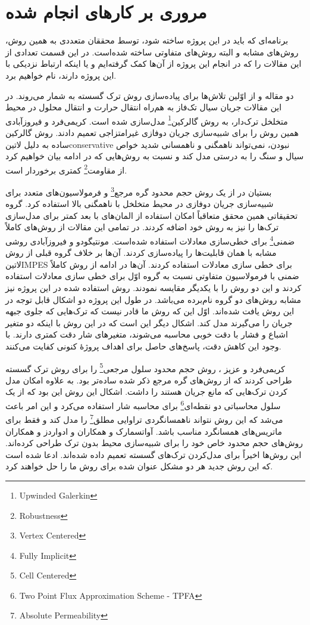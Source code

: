 \section{مروری بر کارهای انجام شده}
برنامه‌ای که باید در این پروژه ساخته شود، توسط محققان متعددی به همین روش، روش‌های مشابه و البته روش‌های متفاوتی ساخته شده‌است. در این قسمت تعدادی از این مقالات را که در انجام این پروژه از آن‌ها کمک گرفته‌ایم و یا اینکه ارتباط نزدیکی با این پروژه دارند، نام خواهیم برد.

دو مقاله \cite{baca} و \cite{noorishad} از اوّلین تلاش‌ها برای پیاده‌سازی روش ترک گسسته به شمار می‌روند. در این مقالات جریان سیال تک‌فاز به هم‌راه انتقال حرارت و انتقال محلول در محیط متخلخل ترک‌دار، به روش گالرکین\footnote{Upwinded Galerkin} مدل‌سازی شده است. کریمی‌فرد و فیروز‌آبادی\cite{karimi1} همین روش را برای شبیه‌سازی جریان دوفازی غیرامتزاجی تعمیم دادند. روش گالرکین ساده به دلیل \text‌لاتین{conservative} نبودن، نمی‌تواند ناهمگنی و ناهمسانی شدید خواص سیال و سنگ را به درستی مدل کند و نسبت به روش‌هایی که در ادامه بیان خواهیم کرد از مقاومت\footnote{Robustness} کمتری برخوردار است.

بستیان در \cite{bastn,basthabil} از یک روش حجم محدود گره مرجع\footnote{Vertex Centered} و فرمولاسیون‌های متعدد  برای شبیه‌سازی  جریان دوفازی در محیط متخلخل با ناهمگنی بالا استفاده کرد. گروه تحقیقاتی همین محقق متعاقباً امکان استفاده از المان‌های با بعد کمتر برای مدل‌سازی ترک‌ها را نیز به روش خود اضافه کردند\cite{reichpaper,reichthes}. در تمامی این مقالات از روش‌های کاملاً ضمنی\footnote{Fully Implicit} برای خطی‌سازی  معادلات استفاده شده‌است. مونتیگودو و فیروزآبادی\cite{mont1,mont2} روشی مشابه با همان قابلیت‌ها را پیاده‌سازی کردند. آن‌ها بر خلاف گروه قبلی از روش  \text‌لاتین{IMPES} برای خطی سازی معادلات استفاده کردند. آن‌ها در ادامه از روش کاملاً ضمنی با فرمولاسیون متفاوتی نسبت به گروه اوّل برای خطی سازی معادلات استفاده کردند  و این دو روش را با یکدیگر مقایسه نمودند\cite{montimpj,montimpc}. روش استفاده شده در این پروژه نیز مشابه روش‌های دو گروه نام‌برده  می‌باشد. در طول این پروژه دو اشکال قابل توجه در این روش یافت شده‌اند. اوّل این که روش ما قادر نیست که ترک‌هایی که جلوی جبهه جریان را می‌گیرند مدل کند. اشکال دیگر این  است که در این روش با اینکه دو متغیر اشباع و فشار با دقت خوبی محاسبه می‌شوند، متغیرهای شار دقت کمتری دارند. با وجود این کاهش دقت، پاسخ‌های حاصل برای اهداف پروژهٔ کنونی کفایت می‌کنند.

کریمی‌فرد و عزیز \cite{karimi2}، روش حجم محدود سلول مرجعی\footnote{Cell Centered} را برای روش ترک گسسته طراحی کردند که از روش‌های گره مرجع
 ذکر شده ساده‌تر بود. به علاوه امکان مدل کردن ترک‌هایی که مانع جریان هستند را داشت. اشکال این روش این بود که از یک سلول محاسباتی  دو نقطه‌ای\footnote{Two Point Flux Approximation Scheme - TPFA} برای محاسبه شار استفاده می‌کرد و این امر باعث می‌شد که این روش نتواند ناهمسانگردی تراوایی مطلق\footnote{Absolute Permeability} را مدل کند و فقط برای ماتریس‌های همسانگرد مناسب باشد. آواتسمارک و همکاران و ادواردز و همکاران روش‌های حجم محدود خاص خود را برای شبیه‌سازی محیط بدون ترک طراحی کرده‌اند\cite{aavatsmark,edwards1}. این روش‌ها اخیراً برای مدل‌کردن ترک‌های گسسته تعمیم داده شده‌اند. ادعا شده است که این روش جدید هر دو مشکل عنوان شده برای روش ما را حل خواهند کرد\cite{edwards2}.

